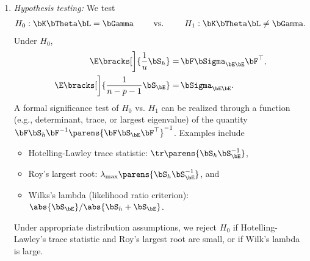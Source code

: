 \documentclass[12pt]{article}
\begin{document}
\begin{enumerate}[label=\textbf{\arabic*.}]
\begin{enumerate}
		\item \textit{Hypothesis testing:} We test 
		\begin{align*}
			H_0: \bK \bTheta \bL = \bGamma \qquad \text{ vs. } \qquad H_1: \bK \bTheta \bL \neq \bGamma. 
		\end{align*}
		Under $H_0$, 
		\begin{align*}
			\E \bracks[\bigg]{\frac{1}{u} \bS_h} = & \, \bF \bSigma_{\bE \bE} \bF^\top, \\ 
			\E \bracks[\bigg]{\frac{1}{n-p-1} \bS_{\bE}} = & \, \bSigma_{\bE \bE}. 
		\end{align*}
		A formal significance test of $H_0$ vs. $H_1$ can be realized through a function (e.g., determinant, trace, or largest eigenvalue) of the quantity $\bF \bS_h \bF^{-1} \parens{\bF \bS_{\bE} \bF^{\top}}^{-1}$. Examples include 
		\begin{itemize}
			\item Hotelling-Lawley trace statistic: $\tr \parens{\bS_h \bS_{\bE}^{-1}}$, 
			\item Roy's largest root: $\lambda_{\max} \parens{\bS_h \bS_{\bE}^{-1}}$, and 
			\item Wilks's lambda (likelihood ratio criterion): $\abs{\bS_{\bE}} / \abs{\bS_h + \bS_{\bE}}$. 
		\end{itemize}
		Under appropriate distribution assumptions, we reject $H_0$ if Hotelling-Lawley's trace statistic and Roy's largest root are small, or if Wilk's lambda is large. 
	\end{enumerate}

\end{enumerate}

\printbibliography
\end{document}

